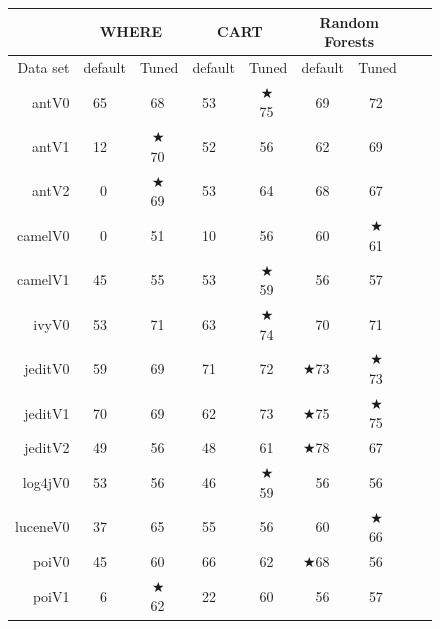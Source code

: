 \documentclass{sig-alternative}
\newcommand{\rone}{}
\newcommand{\rtwo}{}
\newcommand{\rthree}{}
\newcommand{\rfour}{}
\def\baselinestretch{1}
\begin{document}
\begin{center}
\begin{figure}
{\renewcommand{\baselinestretch}{0.8}
\begin{tabular}{r@{~}|r@{~}l@{~}|r@{~}l@{~}|r@{~}l|r@{~}l@{~}|r@{~}l@{~}|r@{~}l@{~}r@{~}l}
      &   \multicolumn{4}{c|}{WHERE}         &   \multicolumn{4}{c|}{CART}         &   \multicolumn{4}{c}{Random Forests}         \\\hline
  Data set   &   \multicolumn{2}{c}{default}         &   \multicolumn{2}{c|}{Tuned}         &   \multicolumn{2}{c}{default}         &   \multicolumn{2}{c|}{Tuned}    &   \multicolumn{2}{c}{default}  &   \multicolumn{2}{c}{Tuned}\\\hline
antV0 & 65 & {\rtwo} & 68 & {\rthree} & 53 &         & $\bigstar$75 & {\rfour} & 69 & {\rthree} & 72 & {\rfour}\\
antV1 & 12 &         & $\bigstar$70 & {\rfour} & 52 & {\rthree} & 56 & {\rthree} & 62 & {\rfour} & 69 & {\rfour}\\
antV2 & 0 &         & $\bigstar$69 & {\rfour} & 53 & {\rthree} & 64 & {\rfour} & 68 & {\rfour} & 67 & {\rfour}\\
camelV0 & 0 &         & 51 & {\rfour} & 10 &         & 56 & {\rfour} & 60 & {\rfour} & $\bigstar$61 & {\rfour}\\
camelV1 & 45 &         & 55 & {\rthree} & 53 & {\rtwo} & $\bigstar$59 & {\rfour} & 56 & {\rthree} & 57 & {\rfour}\\
ivyV0 & 53 &         & 71 & {\rfour} & 63 & {\rtwo} & $\bigstar$74 & {\rfour} & 70 & {\rfour} & 71 & {\rfour}\\
jeditV0 & 59 &         & 69 & {\rthree} & 71 & {\rfour} & 72 & {\rfour} & $\bigstar$73 & {\rfour} & $\bigstar$73 & {\rfour}\\
jeditV1 & 70 & {\rthree} & 69 & {\rtwo} & 62 &         & 73 & {\rfour} & $\bigstar$75 & {\rfour} & $\bigstar$75 & {\rfour}\\
jeditV2 & 49 &         & 56 & {\rone} & 48 &         & 61 & {\rtwo} & $\bigstar$78 & {\rfour} & 67 & {\rthree}\\
log4jV0 & 53 & {\rtwo} & 56 & {\rthree} & 46 &         & $\bigstar$59 & {\rfour} & 56 & {\rthree} & 56 & {\rthree}\\
luceneV0 & 37 &         & 65 & {\rfour} & 55 & {\rthree} & 56 & {\rthree} & 60 & {\rthree} & $\bigstar$66 & {\rfour}\\
poiV0 & 45 &         & 60 & {\rthree} & 66 & {\rfour} & 62 & {\rthree} & $\bigstar$68 & {\rfour} & 56 & {\rtwo}\\
poiV1 & 6 &         & $\bigstar$62 & {\rfour} & 22 & {\rone} & 60 & {\rfour} & 56 & {\rfour} & 57 & {\rfour}\\

\end{tabular}}
\end{figure}
\end{center}
\end{document}
